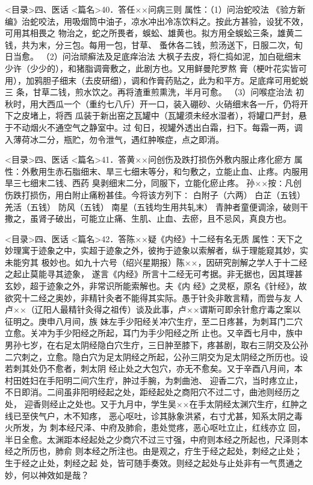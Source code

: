 \documentclass[a4paper,12pt,UTF8,twoside]{ctexbook}
\begin{document}
<目录>四、医话
<篇名>40．答任××问病三则
属性：（1）问治蛇咬法 
《验方新编》治蛇咬法，用吸烟筒中油子，凉水冲出冷冻饮料之。按此方甚验，设犹不效，可用其相畏之 
物治之，蛇之所畏者，蜈蚣、雄黄也。拟方用全蜈蚣三条，雄黄二钱，共为末，分三包。每用一包，甘草、 
蚤休各二钱，煎汤送下，日服二次，旬日当愈。 
（2）问治顽癣法及足底痒治法 
大枫子去皮，将仁捣如泥，加白砒细末少许（少少的），和猪脂调膏敷之，此剧方也。又用鲜曼陀罗熬 
膏（梗叶花实皆可用），加鸦胆子细末（去皮研细），调和作膏药贴之，此为和平方。足底痒可用蛇蜕三 
条，甘草二钱，煎水饮之。再将渣重煎熏洗，半月可愈。 
（3）问喉症治法 
初秋时，用大西瓜一个（重约七八斤）开一口，装入硼砂、火硝细末各一斤，仍将开下之皮堵上，将西 
瓜装于新出窑之瓦罐中（瓦罐须未经水湿者），将罐口严封，悬于不动烟火不通空气之静室中。过 
旬日，视罐外透出白霜，扫下。每霜一两，调入薄荷冰二分，瓶贮，勿令泄气，遇红肿喉症，点之即消。 

<目录>四、医话
<篇名>41．答黄××问创伤及跌打损伤外敷内服止疼化瘀方
属性：外敷用生赤石脂细末、旱三七细末等分，和匀敷之，立能止血、止疼。内服用旱三七细末二钱、西药 
臭剥细末二分，同服下，立能化瘀止疼。 
孙××按∶凡创伤跌打损伤，用白附止痛粉甚佳。今将该方列下∶ 
白附子（六两） 白芷（五钱） 羌活（五钱） 防风（五钱） 南星（五钱均生用共轧末） 
青肿者童便调涂，破则干撒之，虽肾子破出，可能立止痛、生肌、止血、去瘀，且不忌风，真良方也。 

<目录>四、医话
<篇名>42．答陈××疑《内经》十二经有名无质
属性：天下之妙理寓于迹象之中，实超于迹象之外，彼拘于迹象以索解者，纵于理能窥其妙，实未能穷其 
极妙也。如九十六号（绍兴星期报）陈××，因研究剖解之学人于十二经之起止莫能寻其迹象， 
遂言《内经》所言十二经无可考据。非无据也，因其理甚玄妙，超于迹象之外，非常识所能索解也。夫《内 
经》之灵枢，原名《针经》，故欲究十二经之奥妙，非精针灸者不能得其实际。愚于针灸非敢言精，而尝与友 
人卢××（辽阳人最精针灸得之祖传）谈及此事，卢××谓斯可即余针愈疔毒之案以征明之。庚申八月间，族 
妹左手少阳经关冲穴生疔，至二日疼甚，为刺耳门二穴立愈。关冲为手少阳经之所起，耳门为手少阳经之所 
止也。又辛酉七月中，族中男孙七岁，在右足太阴经隐白穴生疔，三日肿至膝下，疼甚剧，取右三阴交及公孙 
二穴刺之，立愈。隐白穴为足太阴经之所起，公孙三阴交为足太阴经之所历也。设若刺其处仍不愈者，刺太阴 
经止处之大包穴，亦无不愈矣。又于辛酉八月间，本村田姓妇在手阳明二间穴生疔，肿过手腕，为刺曲池、 
迎香二穴，当时疼立止，不日即消。二间虽非阳明经起之处，距经起处之商阳穴不过二寸，曲池则经历之处， 
迎香则经止之处也。又于九月中，学生吴××在手太阴经太渊穴生疔，红肿之线已至侠气户，木不知疼， 
恶心呕吐，诊其脉象洪紧，右寸尤甚，知系太阴之毒火所发，为 
刺本经尺泽、中府及肺俞，患处觉疼，恶心呕吐立止，红线亦立 
回，半日全愈。太渊距本经起处之少商穴不过三寸强，中府则本经之所起也，尺泽则本经之所历也，肺俞 
则本经之所注也。由是观之，疔生于经之起处，刺经之止处；生于经之止处，刺经之起 
处，皆可随手奏效。则经之起处与止处非有一气贯通之妙，何以神效如是哉？ 
\end{document}
